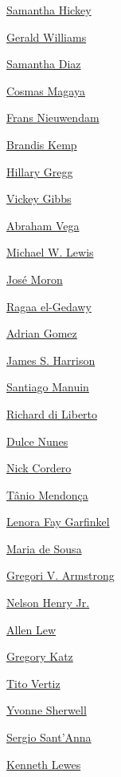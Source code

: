 \protect\hyperlink{samantha-hickey}{Samantha Hickey}

\protect\hyperlink{gerald-williams}{Gerald Williams}

\protect\hyperlink{samantha-diaz}{Samantha Diaz}

\protect\hyperlink{cosmas-magaya}{Cosmas Magaya}

\protect\hyperlink{frans-nieuwendam}{Frans Nieuwendam}

\protect\hyperlink{brandis-kemp}{Brandis Kemp}

\protect\hyperlink{hillary-gregg}{Hillary Gregg}

\protect\hyperlink{vickey-gibbs}{Vickey Gibbs}

\protect\hyperlink{abraham-vega}{Abraham Vega}

\protect\hyperlink{michael-w-lewis}{Michael W. Lewis}

\protect\hyperlink{josuxe9-moron}{José Moron}

\protect\hyperlink{ragaa-elgedawy}{Ragaa el-Gedawy}

\protect\hyperlink{adrian-gomez}{Adrian Gomez}

\protect\hyperlink{james-s-harrison}{James S. Harrison}

\protect\hyperlink{santiago-manuin}{Santiago Manuin}

\protect\hyperlink{richard-di-liberto-}{Richard di Liberto}

\protect\hyperlink{dulce-nunes}{Dulce Nunes}

\protect\hyperlink{nick-cordero}{Nick Cordero}

\protect\hyperlink{tuxe2nio-mendonuxe7a}{Tânio Mendonça}

\protect\hyperlink{lenora-fay-garfinkel}{Lenora Fay Garfinkel}

\protect\hyperlink{maria-de-sousa}{Maria de Sousa}

\protect\hyperlink{gregori-v-armstrong}{Gregori V. Armstrong}

\protect\hyperlink{nelson-henry-jr}{Nelson Henry Jr.}

\protect\hyperlink{allen-lew}{Allen Lew}

\protect\hyperlink{gregory-katz}{Gregory Katz}

\protect\hyperlink{tito-vertiz}{Tito Vertiz}

\protect\hyperlink{yvonne-sherwell}{Yvonne Sherwell}

\protect\hyperlink{sergio-santanna}{Sergio Sant'Anna}

\protect\hyperlink{kenneth-lewes}{Kenneth Lewes}

